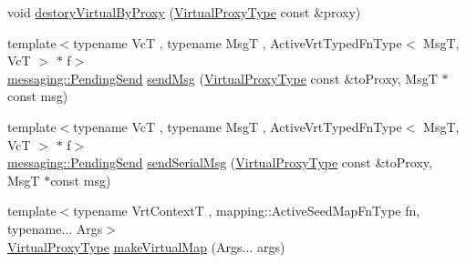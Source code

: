 \begin{DoxyCompactItemize}
\item 
void \hyperlink{structvt_1_1vrt_1_1_virtual_context_manager_ae2e086766e9ce708e2e574d2cf59975b}{destory\+Virtual\+By\+Proxy} (\hyperlink{namespacevt_a1b417dd5d684f045bb58a0ede70045ac}{Virtual\+Proxy\+Type} const \&proxy)
\item 
{\footnotesize template$<$typename VcT , typename MsgT , Active\+Vrt\+Typed\+Fn\+Type$<$ Msg\+T, Vc\+T $>$ $\ast$ f$>$ }\\\hyperlink{structvt_1_1messaging_1_1_pending_send}{messaging\+::\+Pending\+Send} \hyperlink{structvt_1_1vrt_1_1_virtual_context_manager_a0e2611d1a11ebdaa50f7e2d69332039d}{send\+Msg} (\hyperlink{namespacevt_a1b417dd5d684f045bb58a0ede70045ac}{Virtual\+Proxy\+Type} const \&to\+Proxy, MsgT $\ast$const msg)
\item 
{\footnotesize template$<$typename VcT , typename MsgT , Active\+Vrt\+Typed\+Fn\+Type$<$ Msg\+T, Vc\+T $>$ $\ast$ f$>$ }\\\hyperlink{structvt_1_1messaging_1_1_pending_send}{messaging\+::\+Pending\+Send} \hyperlink{structvt_1_1vrt_1_1_virtual_context_manager_acad60c848d71b958be05e41993fc66c2}{send\+Serial\+Msg} (\hyperlink{namespacevt_a1b417dd5d684f045bb58a0ede70045ac}{Virtual\+Proxy\+Type} const \&to\+Proxy, MsgT $\ast$const msg)
\item 
{\footnotesize template$<$typename Vrt\+ContextT , mapping\+::\+Active\+Seed\+Map\+Fn\+Type fn, typename... Args$>$ }\\\hyperlink{namespacevt_a1b417dd5d684f045bb58a0ede70045ac}{Virtual\+Proxy\+Type} \hyperlink{structvt_1_1vrt_1_1_virtual_context_manager_a281e670da4eb6e06ecdb4ef470e1a61d}{make\+Virtual\+Map} (Args... args)
\end{DoxyCompactItemize}

